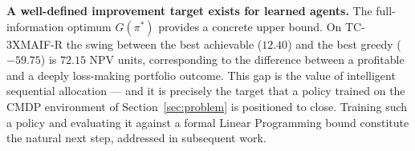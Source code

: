 \textbf{A well-defined improvement target exists for learned agents.}
The full-information optimum $G(\pi^{*})$ provides a concrete upper
bound.  On TC-3XMAIF-R the swing between the best achievable ($12.40$)
and the best greedy ($-59.75$) is $72.15$ NPV units, corresponding to
the difference between a profitable and a deeply loss-making portfolio
outcome.  This gap is the value of intelligent sequential allocation ---
and it is precisely the target that a policy trained on the CMDP
environment of Section~\ref{sec:problem} is positioned to close.
Training such a policy and evaluating it against a formal Linear
Programming bound constitute the natural next step, addressed in
subsequent work.